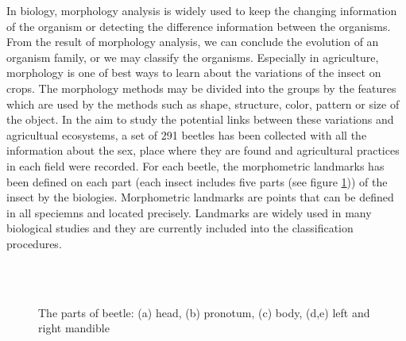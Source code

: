 \documentclass[twoside,twocolumn,10pt]{article}
\begin{document}
In biology, morphology analysis is widely used to keep the changing information of the organism or detecting the difference information between the organisms. From the result of morphology analysis, we can conclude the evolution of an organism family, or we may classify the organisms. Especially in agriculture, morphology is one of best ways to learn about the variations of the insect on crops. The morphology methods may be divided into the groups by the features which are used by the methods such as shape, structure, color, pattern or size of the object. In the aim to study the potential links between these variations and agricultual ecosystems, a set of 291 beetles has been collected with all the information about the sex, place where they are found and agricultural practices in each field were recorded. For each beetle, the morphometric landmarks has been defined on each part (each insect includes five parts (see figure \ref{figparts})) of the insect by the biologies. Morphometric landmarks are points that can be defined in all speciemns and located precisely. Landmarks are widely used in many biological studies and they are currently included into the classification procedures.\\[0.2cm]
\begin{figure}[h]
\centering
{}~~
\\
~~
\\
\caption{The parts of beetle: (a) head, (b) pronotum, (c) body, (d,e) left and right mandible}
\label{figparts}
\end{figure}~\\[0.2cm]
\end{document}
